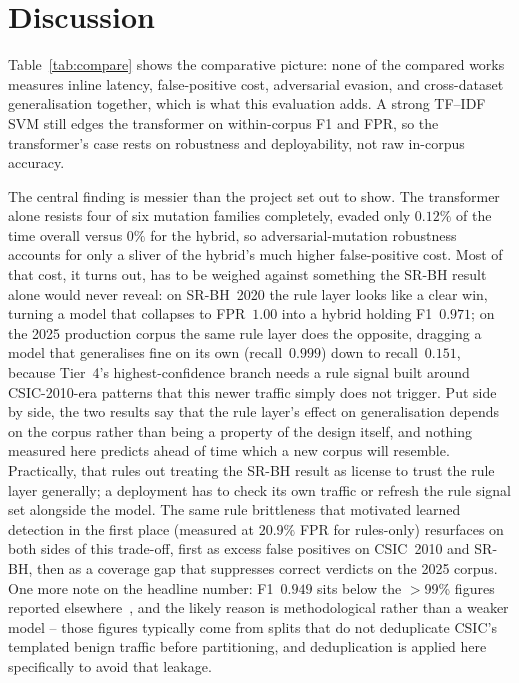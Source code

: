\documentclass[conference]{IEEEtran}
\begin{document}
\section{Discussion}
\label{sec:discussion}
Table~\ref{tab:compare} shows the comparative picture: none of the
compared works measures inline latency, false-positive cost, adversarial
evasion, and cross-dataset generalisation together, which is what this
evaluation adds. A strong TF--IDF SVM still edges the transformer on
within-corpus F1 and FPR, so the transformer's case rests on robustness
and deployability, not raw in-corpus accuracy.

The central finding is messier than the project set out to show. The
transformer alone resists four of six mutation families completely, evaded only $0.12\%$ of
the time overall versus $0\%$ for the hybrid, so adversarial-mutation
robustness accounts for only a sliver of the hybrid's much higher
false-positive cost. Most of that cost, it turns out, has to be weighed
against something the SR-BH result alone would never reveal: on SR-BH~2020
the rule layer looks like a clear win, turning a model that collapses to
FPR~$1.00$ into a hybrid holding F1~$0.971$; on the 2025 production corpus
the same rule layer does the opposite, dragging a model that generalises
fine on its own (recall~$0.999$) down to recall~$0.151$, because Tier~4's
highest-confidence branch needs a rule signal built around CSIC-2010-era
patterns that this newer traffic simply does not trigger. Put side by
side, the two results say that the rule layer's effect on generalisation
depends on the corpus rather than being a property of the design itself,
and nothing measured here predicts ahead of time which a new corpus will
resemble. Practically, that rules out treating the SR-BH result as
license to trust the rule layer generally; a deployment has to check its
own traffic or refresh the rule signal set alongside the model. The same
rule brittleness that motivated learned detection in the first place
(measured at $20.9\%$ FPR for rules-only) resurfaces on both sides of this
trade-off, first as excess false positives on CSIC~2010 and SR-BH, then as
a coverage gap that suppresses correct verdicts on the 2025 corpus. One
more note on the headline number: F1~$0.949$ sits below the $>$99\%
figures reported elsewhere~\cite{wadbert2026,scireports2024novelxsssqli},
and the likely reason is methodological rather than a weaker model --
those figures typically come from splits that do not deduplicate CSIC's
templated benign traffic before partitioning, and deduplication is applied
here specifically to avoid that leakage.
\end{document}
